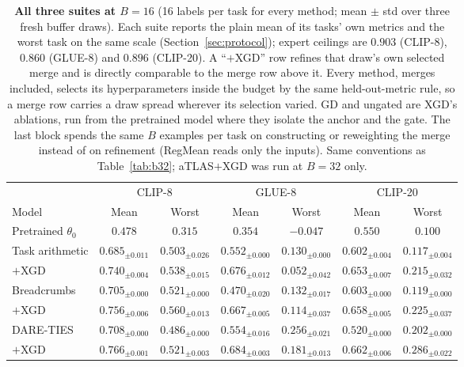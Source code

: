 \documentclass{article} %
\newcommand{\thetab}{\theta_0}
\begin{document}
\begin{table}[t]
\centering
\footnotesize
\setlength{\tabcolsep}{2.4pt}
\caption{\textbf{All three suites at $B{=}16$} (16 labels per task for every method; mean $\pm$ std over three fresh buffer draws). Each suite reports the plain mean of its tasks' own metrics and the worst task on the same scale (Section~\ref{sec:protocol}); expert ceilings are $0.903$ (CLIP-8), $0.860$ (GLUE-8) and $0.896$ (CLIP-20). A ``$+$XGD'' row refines that draw's own selected merge and is directly comparable to the merge row above it. Every method, merges included, selects its hyperparameters inside the budget by the same held-out-metric rule, so a merge row carries a draw spread wherever its selection varied. GD and ungated are XGD's ablations, run from the pretrained model where they isolate the anchor and the gate. The last block spends the same $B$ examples per task on constructing or reweighting the merge instead of on refinement (RegMean reads only the inputs). Same conventions as Table~\ref{tab:b32}; aTLAS$+$XGD was run at $B=32$ only.}
\label{tab:b16}
\begin{tabular}{lcccccc}
\toprule
 & \multicolumn{2}{c}{CLIP-8} & \multicolumn{2}{c}{GLUE-8} & \multicolumn{2}{c}{CLIP-20} \\
\cmidrule(lr){2-3}\cmidrule(lr){4-5}\cmidrule(lr){6-7}
Model & Mean & Worst & Mean & Worst & Mean & Worst \\
\midrule
Pretrained $\thetab$     & $0.478$ & $0.315$ & $0.354$ & $-0.047$ & $0.550$ & $0.100$ \\
\midrule
Task arithmetic          & $0.685_{\pm0.011}$ & $0.503_{\pm0.026}$ & $0.552_{\pm0.000}$ & $0.130_{\pm0.000}$ & $0.602_{\pm0.004}$ & $0.117_{\pm0.004}$ \\
\quad $+$XGD             & $0.740_{\pm0.004}$ & $0.538_{\pm0.015}$ & $0.676_{\pm0.012}$ & $0.052_{\pm0.042}$ & $0.653_{\pm0.007}$ & $0.215_{\pm0.032}$ \\
Breadcrumbs              & $0.705_{\pm0.000}$ & $0.521_{\pm0.000}$ & $0.470_{\pm0.020}$ & $0.132_{\pm0.017}$ & $0.603_{\pm0.000}$ & $0.119_{\pm0.000}$ \\
\quad $+$XGD             & $0.756_{\pm0.006}$ & $0.560_{\pm0.013}$ & $0.667_{\pm0.005}$ & $0.114_{\pm0.037}$ & $0.658_{\pm0.005}$ & $0.225_{\pm0.037}$ \\
DARE-TIES                & $0.708_{\pm0.000}$ & $0.486_{\pm0.000}$ & $0.554_{\pm0.016}$ & $0.256_{\pm0.021}$ & $0.520_{\pm0.000}$ & $0.202_{\pm0.000}$ \\
\quad $+$XGD             & $0.766_{\pm0.001}$ & $0.521_{\pm0.003}$ & $0.684_{\pm0.003}$ & $0.181_{\pm0.013}$ & $0.662_{\pm0.006}$ & $0.286_{\pm0.022}$ \\

\end{tabular}
\end{table}
\end{document}
